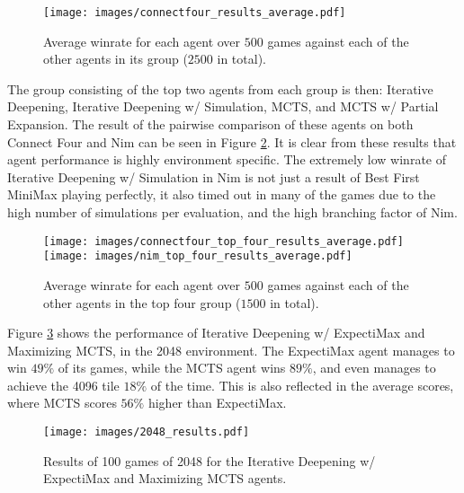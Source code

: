 \begin{figure}[H]
    \centering
    \texttt{[image: images/connectfour\_results\_average.pdf]}
    \caption{Average winrate for each agent over $500$ games against each of
    the other agents in its group ($2500$ in total).}
    \label{fig:c4_results_average} 
\end{figure}

The group consisting of the top two agents from each group is then: Iterative Deepening, Iterative Deepening w/ Simulation, MCTS, and MCTS w/ Partial Expansion. The result of the pairwise comparison of these agents on both Connect Four and Nim can be seen in Figure \ref{fig:top_four_results_average}. It is clear from these results that agent performance is highly environment specific. The extremely low winrate of Iterative Deepening w/ Simulation in Nim is not just a result of Best First MiniMax playing perfectly, it also timed out in many of the games due to the high number of simulations per evaluation, and the high branching factor of Nim. 

\begin{figure}[H]
    \centering
    \texttt{[image: images/connectfour\_top\_four\_results\_average.pdf]}
    \texttt{[image: images/nim\_top\_four\_results\_average.pdf]}
    \caption{Average winrate for each agent over $500$ games against each of
    the other agents in the top four group ($1500$ in total).}
    \label{fig:top_four_results_average}
\end{figure}

Figure \ref{fig:2048_results} shows the performance of Iterative Deepening w/ ExpectiMax and Maximizing MCTS, in the 2048 environment. The ExpectiMax agent manages to win $49\%$ of its games, while the MCTS agent wins $89\%$, and even manages to achieve the 4096 tile $18\%$ of the time. This is also reflected in the average scores, where MCTS scores $56\%$ higher than ExpectiMax.

\begin{figure}[H]
    \centering
    \texttt{[image: images/2048\_results.pdf]}
    \caption{Results of 100 games of 2048 for the Iterative Deepening w/ ExpectiMax and Maximizing MCTS agents.}
    \label{fig:2048_results}
\end{figure}



